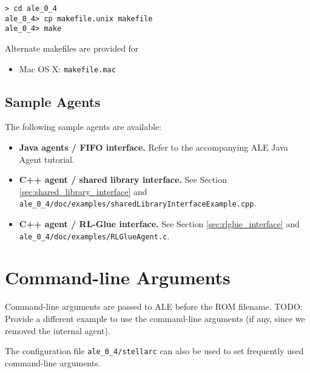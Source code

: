 \documentclass[12pt]{article}
\begin{document}
\begin{verbatim}
> cd ale_0_4
ale_0_4> cp makefile.unix makefile
ale_0_4> make
\end{verbatim}

Alternate makefiles are provided for 

\begin{itemize}
  \item{Mac OS X: \verb+makefile.mac+}
\end{itemize}

\subsection{Sample Agents}

The following sample agents are available:

\begin{itemize}
  \item{\textbf{Java agents / FIFO interface.} Refer to the accompanying ALE Java Agent tutorial.}
  \item{\textbf{C++ agent / shared library interface.} See Section \ref{sec:shared_library_interface} and \\ 
    \verb+ale_0_4/doc/examples/sharedLibraryInterfaceExample.cpp+.}
  \item{\textbf{C++ agent / RL-Glue interface.} See Section \ref{sec:rlglue_interface} and \\
    \verb+ale_0_4/doc/examples/RLGlueAgent.c+.}
\end{itemize}

\section{Command-line Arguments}

Command-line arguments are passed to ALE before the ROM filename. TODO: Provide a different
example to use the command-line arguments (if any, since we removed the internal agent).


The configuration file \verb+ale_0_4/stellarc+ can also be used to set frequently used
command-line arguments. 
\end{document}
